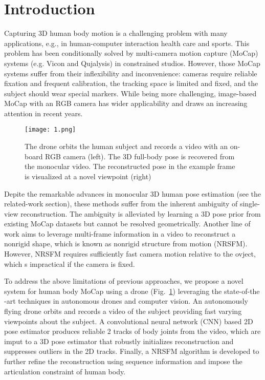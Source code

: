\documentclass[10pt,twocolumn,letterpaper]{article}
\begin{document}
\section{Introduction}
Capturing 3D human body motion is a challenging problem with many applications, e.g., in human-computer interaction health care and sports. This problem has been conditionally solved by multi-camera motion capture (MoCap) systems (e.g. Vicon and Qujalysis) in constrained studios\cite{Simo2012Single}. However, those MoCap systems suffer from their inflexibility and inconvenience: cameras require reliable fixation and frequent calibration, the tracking space is limited and fixed, and the subject should wear special markers. While being more challenging, image-based MoCap with an RGB camera has wider applicability and draws an increasing attention in recent years.
\begin{figure}
\begin{center}
  \texttt{[image: 1.png]}\\
  \caption{The drone orbits the human subject and records a video with an on-board RGB camera (left). The 3D full-body pose is recovered from the monocular video. The reconstructed pose in the example frame is visualized at a novel viewpoint (right)}\label{1}
\end{center}
\end{figure}
\par
Depite the remarkable advances in monocular 3D human pose estimation (see the related-work section), these methods suffer from the inherent ambiguity of single-view reconstruction. The ambiguity is alleviated by learning a 3D pose prior from existing MoCap datasets but cannot be resolved geometrically\cite{Guan2010Estimating}. Another line of work aims to leverage multi-frame information in a video to reconstruct a nonrigid shape, which is known as nonrigid structure from motion (NRSFM). However, NRSFM requires sufficiently fast camera motion relative to the ovject, which s impractical if the camera is fixed. 
\par
To address the above limitations of previous approaches, we propose a novel system for human body MoCap using a drone (Fig.~\ref{1}) leveraging the state-of-the -art techniques in autonomous drones and computer vision. An autonomously flying drone orbits and records a video of the subject providing fast varying viewpoints about the subject. A convolutional neural network (CNN) based 2D pose estimator produces reliable 2 tracks of body joints from the video, which are imput to a 3D pose estimator that robustly initializes reconstruction and suppresses outliers in the 2D tracks. Finally, a NRSFM algorithm is developed to further refine the reconstruction using sequence information and impose the articulation constraint of human body\cite{Paladini2009Factorization}.
\end{document}
